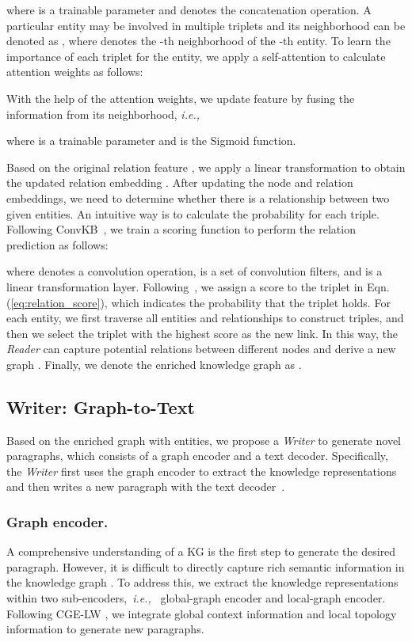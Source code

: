 \documentclass[letterpaper]{article}
\def\hmg{\textcolor{black}}
\def\ie{\emph{i.e., }}
\begin{document}
where  is a trainable parameter and  denotes the concatenation operation. 
A particular entity  may be involved in multiple triplets and its neighborhood can be denoted as , where  denotes the -th neighborhood of \hmg{the} -th entity. 
To learn the importance of each triplet for the entity, we apply a self-attention to calculate attention weights 
as follows:

With the help of the attention weights, we update feature  by fusing the information from its neighborhood, \ie

where  is a trainable parameter and  is the Sigmoid function.

Based on the original relation feature 
, 
we apply a linear transformation to obtain the updated relation embedding .
After updating the node and relation embeddings, we need to 
determine whether there is a relationship between two given entities. An intuitive way is to calculate the probability for each triple. Following ConvKB~\cite{Nguyen2018ANE}, we train a scoring function to perform the relation prediction as follows:

where  denotes a convolution operation, {} is a set of convolution filters, and  is a linear transformation layer. Following~\cite{Nathani2019LearningAE}, we assign a score  to the triplet  in Eqn.(\ref{eq:relation_score}), which indicates the probability that the triplet holds. 
For each entity, we first traverse all entities and relationships to construct triples, and then we select the triplet with the highest score as the new link.
In this way, the \textit{Reader} can capture potential relations between different nodes and derive a new graph .
Finally, we denote the enriched knowledge graph as .



\subsection{Writer: Graph-to-Text}
Based on the enriched graph  with  entities, we propose a \textit{Writer} to generate novel paragraphs, 
which consists of a graph encoder and a text decoder.
Specifically, the \textit{Writer} first uses the graph encoder to extract the knowledge representations and then writes a new paragraph with the text decoder~\cite{Vaswani2017AttentionIA}.
\subsubsection{Graph encoder.}
A comprehensive understanding of a KG  is the first step to generate the desired paragraph. However, it is difficult to directly capture rich semantic information in the knowledge graph . 
To address this,
we extract the knowledge representations within two sub-encoders,~\ie~global-graph encoder and local-graph encoder.
Following CGE-LW \cite{ribeiro2020modeling}, we integrate global context information and local topology information to generate new paragraphs.
\end{document}
